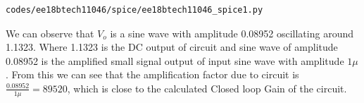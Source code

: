 \begin{enumerate}[label=\arabic*.,ref=\theenumi]
\begin{lstlisting}
codes/ee18btech11046/spice/ee18btech11046_spice1.py
\end{lstlisting}
We can observe that $V_{o}$ is a sine wave with amplitude 0.08952 oscillating around 1.1323. Where 1.1323 is the DC output of circuit and sine wave of amplitude 0.08952 is the amplified small signal output of input sine wave with amplitude $1\mu$. From this we can see that the amplification factor due to circuit is $\frac{0.08952}{1\mu}=89520$, which is close to the calculated Closed loop Gain of the circuit. 












\end{enumerate}
